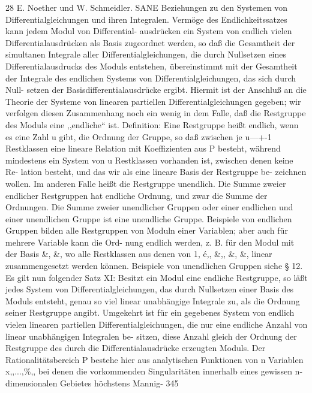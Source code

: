 \documentclass[11pt,a4paper]{article}
\theoremstyle{plain}
\theoremstyle{definition}
\begin{document}
28 
E. Noether und W. Schmeidler. 
SANE 
Beziehungen zu den Systemen von Differentialgleichungen 
und ihren Integralen. 
Vermöge des Endlichkeitssatzes kann jedem Modul von Differential- 
ausdrücken ein System von endlich vielen Differentialausdrücken als Basis 
zugeordnet werden, so daß die Gesamtheit der simultanen Integrale aller 
Differentialgleichungen, 
die durch Nullsetzen 
eines Differentialausdrucks 
des Moduls 
entstehen, übereinstimmt 
mit der Gesamtheit 
der Integrale 
des endlichen Systems von Differentialgleichungen, 
das sich durch Null- 
setzen 
der Basisdifferentialausdrücke 
ergibt. 
Hiermit 
ist der Anschluß 
an die Theorie der Systeme von linearen partiellen Differentialgleichungen 
gegeben; wir verfolgen diesen Zusammenhang noch ein wenig in dem Falle, 
daß die Restgruppe des Moduls eine ,,endliche`` ist. 
Definition: Eine Restgruppe heißt endlich, wenn 
es eine Zahl u 
gibt, die Ordnung der Gruppe, 
so daß zwischen je u---+-1 Restklassen 
eine lineare Relation mit Koeffizienten aus P besteht, während mindestens 
ein System von u Restklassen vorhanden ist, zwischen denen keine Re- 
lation 
besteht, und das wir als eine lineare Basis der Restgruppe be- 
zeichnen wollen. 
Im anderen Falle heißt die Restgruppe unendlich. 
Die Summe zweier endlicher Restgruppen hat endliche Ordnung, und 
zwar die Summe der Ordnungen. 
Die Summe zweier unendlicher Gruppen 
oder einer endlichen und einer unendlichen Gruppe ist eine unendliche 
Gruppe. 
Beispiele von endlichen Gruppen bilden alle Restgruppen von 
Moduln einer Variablen; aber auch für mehrere Variable kann die Ord- 
nung endlich werden, z. B. für den Modul mit der Basis \&, \&, wo alle 
Restklassen aus denen von 1, é,, \&,, \&, \&, linear zusammengesetzt werden 
können. 
Beispiele von unendlichen Gruppen siehe \S{} 12. 
Es gilt nun folgender 
Satz XI: Besitzt ein Modul eine endliche Restgruppe, so läßt jedes 
System von Differentialgleichungen, 
das durch Nullsetzen 
einer Basis 
des Moduls entsteht, genau so viel linear unabhängige Integrale zu, als 
die Ordnung seiner Restgruppe angibt. 
Umgekehrt ist für ein gegebenes 
System von 
endlich 
vielen 
linearen 
partiellen Differentialgleichungen, 
die nur eine endliche Anzahl von linear unabhängigen 
Integralen 
be- 
sitzen, diese Anzahl gleich der Ordnung der Restgruppe des durch die 
Differentialausdrücke erzeugten Moduls. 
Der Rationalitätsbereich P bestehe hier aus analytischen Funktionen 
von n Variablen x,,...,\%,, bei denen die vorkommenden Singularitäten 
innerhalb 
eines gewissen 
n-dimensionalen 
Gebietes 
höchstens 
Mannig- 
345
\end{document}

